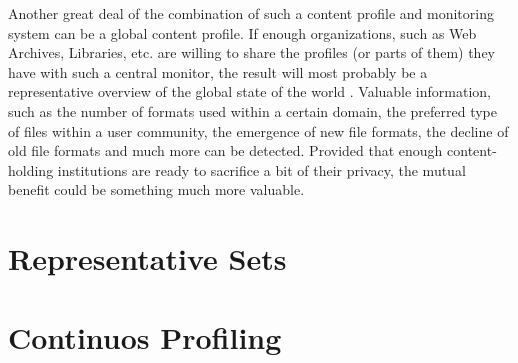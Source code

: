 Another great deal of the combination of such a content profile and monitoring system can be a global content profile. If enough organizations, such as Web Archives, Libraries, etc. are willing to share the profiles (or parts of them) they have with such a central monitor, the result will most probably be a representative overview of the global state of the world \cite{duretec:2012:watch}. Valuable information, such as the number of formats used within a certain domain, the preferred type of files within a user community, the emergence of new file formats, the decline of old file formats and much more can be detected. Provided that enough content-holding institutions are ready to sacrifice a bit of their privacy, the mutual benefit could be something much more valuable.

\section{Representative Sets}


\section{Continuos Profiling}
